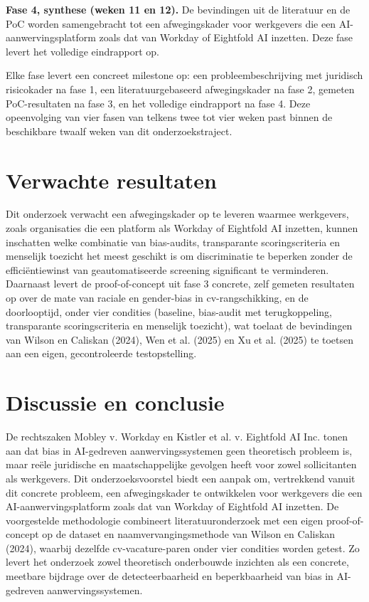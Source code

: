 \documentclass{hogent-article}
\begin{document}
\textbf{Fase 4, synthese (weken 11 en 12).} De bevindingen uit de
literatuur en de PoC worden samengebracht tot een afwegingskader voor
werkgevers die een AI-aanwervingsplatform zoals dat van Workday of
Eightfold AI inzetten. Deze fase levert het volledige eindrapport op.

Elke fase levert een concreet milestone op: een probleembeschrijving met
juridisch risicokader na fase 1, een literatuurgebaseerd afwegingskader na
fase 2, gemeten PoC-resultaten na fase 3, en het volledige eindrapport na
fase 4. Deze opeenvolging van vier fasen van telkens twee tot vier weken
past binnen de beschikbare twaalf weken van dit onderzoekstraject.

\section{Verwachte resultaten}%
\label{sec:resultaten}

Dit onderzoek verwacht een afwegingskader op te leveren waarmee werkgevers,
zoals organisaties die een platform als Workday of Eightfold AI inzetten,
kunnen inschatten welke combinatie van bias-audits, transparante
scoringscriteria en menselijk toezicht het meest geschikt is om
discriminatie te beperken zonder de efficiëntiewinst van geautomatiseerde
screening significant te verminderen. Daarnaast levert de proof-of-concept
uit fase 3 concrete, zelf gemeten resultaten op over de mate van raciale en
gender-bias in cv-rangschikking, en de doorlooptijd, onder vier condities
(baseline, bias-audit met terugkoppeling, transparante scoringscriteria en
menselijk toezicht), wat toelaat de bevindingen van Wilson en Caliskan
(2024), Wen et al. (2025) en Xu et al. (2025) te toetsen aan een eigen,
gecontroleerde testopstelling.

\section{Discussie en conclusie}%
\label{sec:conclusie}

De rechtszaken Mobley v. Workday en Kistler et al. v. Eightfold AI Inc.
tonen aan dat bias in AI-gedreven aanwervingssystemen geen theoretisch
probleem is, maar reële juridische en maatschappelijke gevolgen heeft voor
zowel sollicitanten als werkgevers. Dit onderzoeksvoorstel biedt een aanpak
om, vertrekkend vanuit dit concrete probleem, een afwegingskader te
ontwikkelen voor werkgevers die een AI-aanwervingsplatform zoals dat van
Workday of Eightfold AI inzetten. De voorgestelde methodologie combineert
literatuuronderzoek met een eigen proof-of-concept op de dataset en
naamvervangingsmethode van Wilson en Caliskan (2024), waarbij dezelfde
cv-vacature-paren onder vier condities worden getest. Zo levert het
onderzoek zowel theoretisch onderbouwde inzichten als een concrete, meetbare
bijdrage over de detecteerbaarheid en beperkbaarheid van bias in
AI-gedreven aanwervingssystemen.

\printbibliography[heading=bibintoc]
\end{document}
